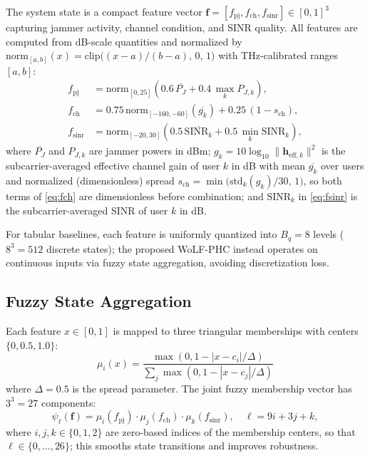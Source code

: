\documentclass[10pt,conference]{IEEEtran}
\newcommand{\vect}[1]{\mathbf{#1}}
\begin{document}
The system state is a compact feature vector
$\mathbf{f} = [f_{\mathrm{pj}}, f_{\mathrm{ch}}, f_{\mathrm{sinr}}] \in [0,1]^3$ capturing jammer activity, channel condition, and SINR quality. All features are computed from dB-scale quantities and normalized by $\text{norm}_{[a,b]}(x) = \text{clip}\!\big((x-a)/(b-a),\,0,\,1\big)$ with THz-calibrated ranges $[a,b]$:
\begin{align}
f_{\mathrm{pj}} &=
\text{norm}_{[0,25]}\!\left(
0.6\,\overline{P_J} + 0.4\,\max_k P_{J,k}
\right), \label{eq:fpj}\\
f_{\mathrm{ch}} &=
0.75\,\text{norm}_{[-160,-60]}\!\left(\overline{g_k}\right) + 0.25\,(1-s_{\mathrm{ch}}), \label{eq:fch}\\
f_{\mathrm{sinr}} &=
\text{norm}_{[-20,30]}\!\left(
0.5\,\overline{\mathrm{SINR}_k} + 0.5\,\min_k \mathrm{SINR}_k
\right), \label{eq:fsinr}
\end{align}
where $\overline{P_J}$ and $P_{J,k}$ are jammer powers in dBm; $g_k = 10\log_{10}\|\mathbf{h}_{\mathrm{eff},k}\|^2$ is the subcarrier-averaged effective channel gain of user $k$ in dB with mean $\overline{g_k}$ over users and normalized (dimensionless) spread $s_{\mathrm{ch}} = \min\!\big(\mathrm{std}_k(g_k)/30,\,1\big)$, so both terms of \eqref{eq:fch} are dimensionless before combination; and $\mathrm{SINR}_k$ in \eqref{eq:fsinr} is the subcarrier-averaged SINR of user $k$ in dB.

For tabular baselines, each feature is uniformly quantized into $B_q=8$ levels ($8^3=512$ discrete states); the proposed WoLF-PHC instead operates on continuous inputs via fuzzy state aggregation, avoiding discretization loss.


\subsection{Fuzzy State Aggregation}

Each feature $x \in [0,1]$ is mapped to three triangular memberships with centers $\{0,0.5,1.0\}$:
\begin{equation}
\mu_i(x) = \frac{\max(0, 1 - |x - c_i|/\Delta)}{\sum_j \max(0, 1 - |x - c_j|/\Delta)}
\label{eq:fuzzy}
\end{equation}
where $\Delta = 0.5$ is the spread parameter. The joint fuzzy membership vector has $3^3 = 27$ components:
\begin{equation}
\psi_\ell(\vect{f}) = \mu_i(f_{\text{pj}}) \cdot \mu_j(f_{\text{ch}}) \cdot \mu_k(f_{\text{sinr}}), \quad \ell = 9i + 3j + k,
\label{eq:fuzzy_joint}
\end{equation}
where $i,j,k \in \{0,1,2\}$ are zero-based indices of the membership centers, so that $\ell \in \{0,\dots,26\}$; this smooths state transitions and improves robustness.
\end{document}

